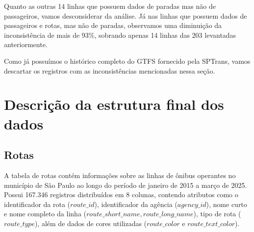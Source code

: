 \begin{table}[htbp]
\centering
{}
\caption{Quantidade de passageiros por tempo de operação das linhas. Fonte: A própria autora}
\label{tab:distancias_rotas}
\end{table}

Quanto as outras 14 linhas que possuem dados de paradas mas não de passageiros, vamos desconsiderar da análise. Já nas linhas que possuem dados de passageiros e rotas, mas não de paradas, observamos uma diminuição da inconsistência de mais de 93\%, sobrando apenas 14 linhas das 203 levantadas anteriormente. 

Como já possuímos o histórico completo do GTFS fornecido pela SPTrans, vamos descartar os registros com as inconsistências mencionadas nessa seção.

\section{Descrição da estrutura final dos dados}

\subsection{Rotas}

A tabela de rotas contém informações sobre as linhas de ônibus operantes no município de São Paulo ao longo do período de janeiro de 2015 a março de 2025. Possui 167.346 registros distribuídos em 8 colunas, contendo atributos como o identificador da rota ($route\_id$), identificador da agência ($agency\_id$), nome curto e nome completo da linha ($route\_short\_name, route\_long\_name$), tipo de rota ($route\_type$), além de dados de cores utilizadas ($route\_color$ e $route\_text\_color$). 

